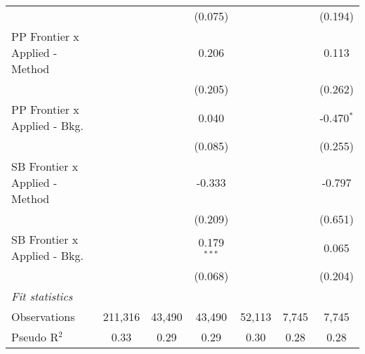 \begin{tabular}{lcccccc}
                                  &               &                & (0.075)        &               &               & (0.194)\\   
   PP Frontier x Applied - Method &               &                & 0.206          &               &               & 0.113\\   
                                  &               &                & (0.205)        &               &               & (0.262)\\   
   PP Frontier x Applied - Bkg.   &               &                & 0.040          &               &               & -0.470$^{*}$\\   
                                  &               &                & (0.085)        &               &               & (0.255)\\   
   SB Frontier x Applied - Method &               &                & -0.333         &               &               & -0.797\\   
                                  &               &                & (0.209)        &               &               & (0.651)\\   
   SB Frontier x Applied - Bkg.   &               &                & 0.179$^{***}$  &               &               & 0.065\\   
                                  &               &                & (0.068)        &               &               & (0.204)\\   
   \midrule
   \emph{Fit statistics}\\
   Observations                   & 211,316       & 43,490         & 43,490         & 52,113        & 7,745         & 7,745\\  
   Pseudo R$^2$                   & 0.33          & 0.29           & 0.29           & 0.30          & 0.28          & 0.28\\  
   

\end{tabular}
